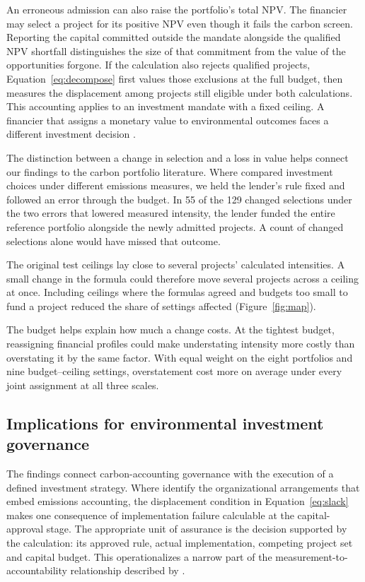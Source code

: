 An erroneous admission can also raise the portfolio's total NPV. The financier may select a project for its positive NPV even though it fails the carbon screen. Reporting the capital committed outside the mandate alongside the qualified NPV shortfall distinguishes the size of that commitment from the value of the opportunities forgone. If the calculation also rejects qualified projects, Equation~\eqref{eq:decompose} first values those exclusions at the full budget, then measures the displacement among projects still eligible under both calculations. This accounting applies to an investment mandate with a fixed ceiling. A financier that assigns a monetary value to environmental outcomes faces a different investment decision \citep{schoenmaker}.

The distinction between a change in selection and a loss in value helps connect our findings to the carbon portfolio literature. Where \citet{anquetin} compared investment choices under different emissions measures, we held the lender's rule fixed and followed an error through the budget. In 55 of the 129 changed selections under the two errors that lowered measured intensity, the lender funded the entire reference portfolio alongside the newly admitted projects. A count of changed selections alone would have missed that outcome.

The original test ceilings lay close to several projects' calculated intensities. A small change in the formula could therefore move several projects across a ceiling at once. Including ceilings where the formulas agreed and budgets too small to fund a project reduced the share of settings affected (Figure~\ref{fig:map}).

The budget helps explain how much a change costs. At the tightest budget, reassigning financial profiles could make understating intensity more costly than overstating it by the same factor. With equal weight on the eight portfolios and nine budget--ceiling settings, overstatement cost more on average under every joint assignment at all three scales.

\subsection{Implications for environmental investment governance}
The findings connect carbon-accounting governance with the execution of a defined investment strategy. Where \citet{ruan2026} identify the organizational arrangements that embed emissions accounting, the displacement condition in Equation~\eqref{eq:slack} makes one consequence of implementation failure calculable at the capital-approval stage. The appropriate unit of assurance is the decision supported by the calculation: its approved rule, actual implementation, competing project set and capital budget. This operationalizes a narrow part of the measurement-to-accountability relationship described by \citet{tian2026}.

